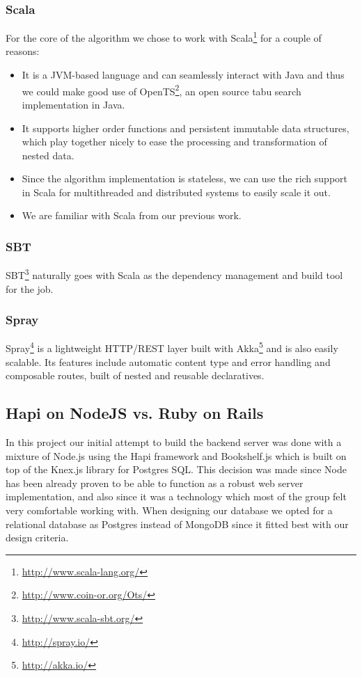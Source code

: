 \subsubsection{Scala}
For the core of the algorithm we chose to work with Scala\footnote{\url{http://www.scala-lang.org/}} for a couple of reasons:
\begin{itemize}
\item It is a JVM-based language and can seamlessly interact with Java and thus we could make good use of OpenTS\footnote{\url{http://www.coin-or.org/Ots/}}, an open source tabu search implementation in Java.
\item It supports higher order functions and persistent immutable data structures, which play together nicely to ease the processing and transformation of nested data.
\item Since the algorithm implementation is stateless, we can use the rich support in Scala for multithreaded and distributed systems to easily scale it out.
\item We are familiar with Scala from our previous work.
\end{itemize}

\subsubsection{SBT}
SBT\footnote{\url{http://www.scala-sbt.org/}} naturally goes with Scala as the dependency management and build tool for the job.

\subsubsection{Spray}
Spray\footnote{\url{http://spray.io/}} is a lightweight HTTP/REST layer built with Akka\footnote{\url{http://akka.io/}} and is also easily scalable. Its features include automatic content type and error handling and composable routes, built of nested and reusable declaratives.

\subsection{Hapi on NodeJS vs. Ruby on Rails}
In this project our initial attempt to build the backend server was done with a mixture of Node.js using the Hapi framework and Bookshelf.js which is built on top of the Knex.js library for Postgres SQL. This decision was made since Node has been already proven to be able to function as a robust web server implementation, and also since it was a technology which most of the group felt very comfortable working with. When designing our database we opted for a relational database as Postgres instead of MongoDB since it fitted best with our design criteria. 

